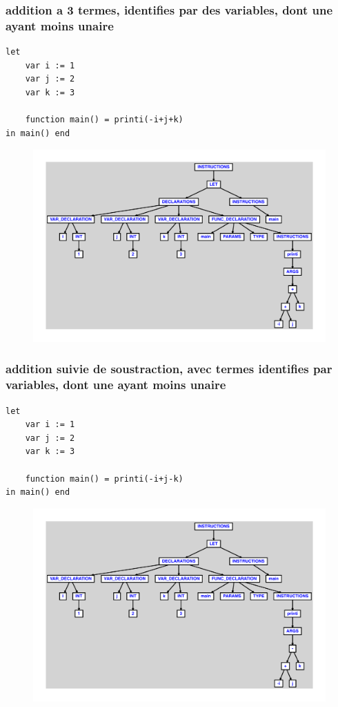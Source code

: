 \documentclass{article}
\begin{document}
\subsubsection{addition a 3 termes, identifies par des variables, dont une ayant moins unaire}
\begin{lstlisting}
let
	var i := 1
	var j := 2
	var k := 3

	function main() = printi(-i+j+k)
in main() end
\end{lstlisting}
\newpage
\begin{figure}[H]
\centering
\includegraphics[max width=\textwidth]{ast/ast_79.pdf}
\end{figure}
\newpage
\subsubsection{addition suivie de soustraction, avec termes identifies par variables, dont une ayant moins unaire}
\begin{lstlisting}
let
	var i := 1
	var j := 2
	var k := 3

	function main() = printi(-i+j-k)
in main() end
\end{lstlisting}
\newpage
\begin{figure}[H]
\centering
\includegraphics[max width=\textwidth]{ast/ast_80.pdf}
\end{figure}
\newpage
\end{document}
